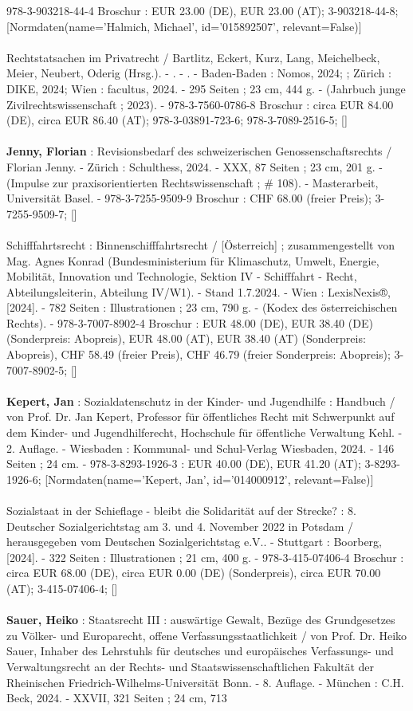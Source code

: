 \documentclass{article}
\begin{document}
\begin{multicols}{3}
978-3-903218-44-4 Broschur : EUR 23.00 (DE), EUR 23.00 (AT); 3-903218-44-8; [Normdaten(name='Halmich, Michael', id='015892507', relevant=False)]\\\\Rechtstatsachen im Privatrecht / Bartlitz, Eckert, Kurz, Lang, Meichelbeck, Meier, Neubert, Oderig (Hrsg.). - . - . - Baden-Baden : Nomos, 2024; ; Zürich : DIKE, 2024; Wien : facultus, 2024. - 295 Seiten ; 23 cm, 444 g. - (Jahrbuch junge Zivilrechtswissenschaft ; 2023). - 978-3-7560-0786-8 Broschur : circa EUR 84.00 (DE), circa EUR 86.40 (AT); 978-3-03891-723-6; 978-3-7089-2516-5; []\\\\\textbf{Jenny, Florian} : Revisionsbedarf des schweizerischen Genossenschaftsrechts / Florian Jenny. - Zürich : Schulthess, 2024. - XXX, 87 Seiten ; 23 cm, 201 g. - (Impulse zur praxisorientierten Rechtswissenschaft ; \# 108). - Masterarbeit, Universität Basel. - 978-3-7255-9509-9 Broschur : CHF 68.00 (freier Preis); 3-7255-9509-7; []\\\\Schifffahrtsrecht : Binnenschifffahrtsrecht / [Österreich] ; zusammengestellt von Mag. Agnes Konrad (Bundesministerium für Klimaschutz, Umwelt, Energie, Mobilität, Innovation und Technologie, Sektion IV - Schifffahrt - Recht, Abteilungsleiterin, Abteilung IV/W1). - Stand 1.7.2024. - Wien : LexisNexis®, [2024]. - 782 Seiten : Illustrationen ; 23 cm, 790 g. - (Kodex des österreichischen Rechts). - 978-3-7007-8902-4 Broschur : EUR 48.00 (DE), EUR 38.40 (DE) (Sonderpreis: Abopreis), EUR 48.00 (AT), EUR 38.40 (AT) (Sonderpreis: Abopreis), CHF 58.49 (freier Preis), CHF 46.79 (freier Sonderpreis: Abopreis); 3-7007-8902-5; []\\\\\textbf{Kepert, Jan} : Sozialdatenschutz in der Kinder- und Jugendhilfe : Handbuch / von Prof. Dr. Jan Kepert, Professor für öffentliches Recht mit Schwerpunkt auf dem Kinder- und Jugendhilferecht, Hochschule für öffentliche Verwaltung Kehl. - 2. Auflage. - Wiesbaden : Kommunal- und Schul-Verlag Wiesbaden, 2024. - 146 Seiten ; 24 cm. - 978-3-8293-1926-3 : EUR 40.00 (DE), EUR 41.20 (AT); 3-8293-1926-6; [Normdaten(name='Kepert, Jan', id='014000912', relevant=False)]\\\\Sozialstaat in der Schieflage - bleibt die Solidarität auf der Strecke? : 8. Deutscher Sozialgerichtstag am 3. und 4. November 2022 in Potsdam / herausgegeben vom Deutschen Sozialgerichtstag e.V.. - Stuttgart : Boorberg, [2024]. - 322 Seiten : Illustrationen ; 21 cm, 400 g. - 978-3-415-07406-4 Broschur : circa EUR 68.00 (DE), circa EUR 0.00 (DE) (Sonderpreis), circa EUR 70.00 (AT); 3-415-07406-4; []\\\\\textbf{Sauer, Heiko} : Staatsrecht III : auswärtige Gewalt, Bezüge des Grundgesetzes zu Völker- und Europarecht, offene Verfassungsstaatlichkeit / von Prof. Dr. Heiko Sauer, Inhaber des Lehrstuhls für deutsches und europäisches Verfassungs- und Verwaltungsrecht an der Rechts- und Staatswissenschaftlichen Fakultät der Rheinischen Friedrich-Wilhelms-Universität Bonn. - 8. Auflage. - München : C.H. Beck, 2024. - XXVII, 321 Seiten ; 24 cm, 713 
\end{multicols}
\end{document}
